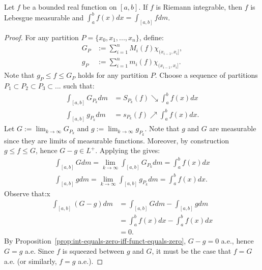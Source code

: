 \begin{theorem}
    Let $f$ be a bounded real function on $[a,b]$. If $f$ is Riemann integrable, then $f$ is Lebesgue measurable and $\int_a^b f(x)dx = \int_{[a,b]}f dm$.
\end{theorem}
    \begin{proof}
        For any partition $P = \{x_0,x_1,...,x_n\}$, define:
            \begin{equation*}
            \begin{split}
                G_P & := \sum_{i = 1}^n M_i(f) \chi_{(x_{i-1},x_i]}, \\
                g_P & := \sum_{i = 1}^n m_i(f) \chi_{(x_{i-1},x_i]}.
            \end{split}
            \end{equation*}
        Note that $g_P \leq f \leq G_P$ holds for any partition $P$. Choose a sequence of partitions $P_1 \subset P_2 \subset P_3 \subset...$ such that:
            \begin{equation*}
            \begin{split}
                \int_{[a,b]} G_{P_k}dm &= S_{P_k}(f) \searrow \int_a^b f(x)dx \\
                \int_{[a,b]} g_{P_k}dm &= s_{P_k}(f) \nearrow \int_a^b f(x)dx.
            \end{split}
            \end{equation*}
        Let $G := \lim_{k \rightarrow \infty}G_{P_k}$ and $g := \lim_{k \rightarrow \infty}g_{P_k}$. Note that $g$ and $G$ are measurable since they are limits of measurable functions. Moreover, by construction $g \leq f \leq G$, hence $G - g \in L^+$. Applying the  gives:
            \begin{equation*}
            \begin{split}
                \int_{[a,b]} Gdm = \lim_{k \rightarrow \infty} \int_{[a,b]} G_{P_k}dm = \int_a^b f(x)dx \\
                \int_{[a,b]} gdm = \lim_{k \rightarrow \infty} \int_{[a,b]} g_{P_k}dm = \int_a^b f(x)dx.
            \end{split}
            \end{equation*}
        Observe that:x
            \begin{equation*}
            \begin{split}
                \int_{[a,b]} (G - g)dm 
                & = \int_{[a,b]} Gdm - \int_{[a,b]} gdm \\
                & = \int_a^b f(x)dx - \int_a^b f(x)dx \\
                & = 0.
            \end{split}
            \end{equation*}
        By Proposition~\ref{prop:int-equals-zero-iff-funct-equals-zero}, $G - g = 0$ a.e., hence $G = g$ a.e. Since $f$ is squeezed between $g$ and $G$, it must be the case that $f = G$ a.e. (or similarly, $f = g$ a.e.).


\end{proof}
